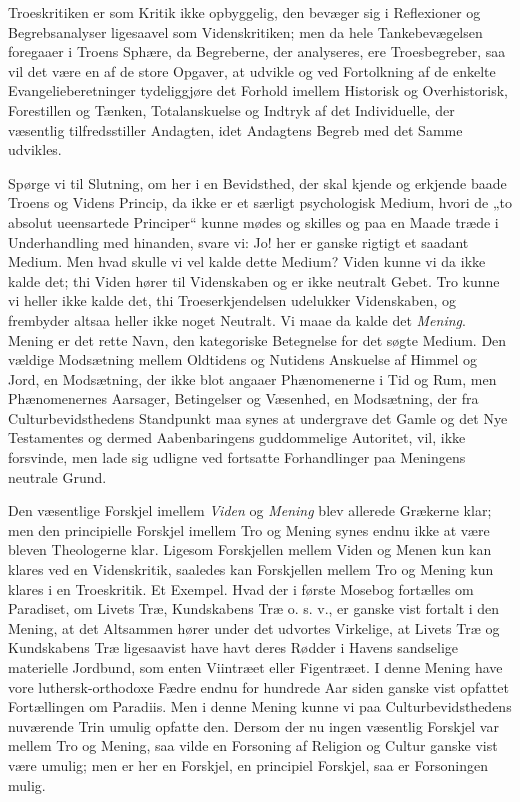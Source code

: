 \documentclass[12pt]{book}
\newcommand{\opage}[1]{\marginnote{\footnotesize\textit{[#1]}}}
\begin{document}
Troeskritiken er som Kritik ikke opbyggelig, den bevæger
sig i Reflexioner og Begrebsanalyser ligesaavel som Videnskritiken;
men da hele Tankebevægelsen foregaaer i Troens
Sphære, da Begreberne, der analyseres, ere Troesbegreber,
saa vil det være en af de store Opgaver, at udvikle og ved
Fortolkning af de enkelte Evangelieberetninger tydeliggjøre det
Forhold imellem Historisk og Overhistorisk, Forestillen og
Tænken, Totalanskuelse og Indtryk af det Individuelle, der
væsentlig tilfredsstiller Andagten, idet Andagtens Begreb med
det Samme udvikles.

Spørge vi til Slutning, om her i en Bevidsthed, der
skal kjende og erkjende baade Troens og Videns Princip, da
ikke er et særligt psychologisk Medium, hvori de „to absolut
ueensartede Principer“ kunne mødes og skilles og paa en
Maade træde i Underhandling med hinanden, svare vi:
Jo! her er ganske rigtigt et saadant Medium. Men hvad
skulle vi vel kalde dette Medium? Viden kunne vi da ikke
kalde det; thi Viden hører til Videnskaben og er ikke neutralt
Gebet. Tro kunne vi heller ikke kalde det, thi Troeserkjendelsen
udelukker Videnskaben, og frembyder altsaa heller
ikke noget Neutralt. Vi maae da kalde det \emph{Mening}.
Mening er det rette Navn, den kategoriske Betegnelse for det
søgte Medium. Den vældige Modsætning mellem Oldtidens
og Nutidens Anskuelse af Himmel og Jord, en Modsætning,
der ikke blot angaaer Phænomenerne i Tid og Rum, men
Phænomenernes Aarsager, Betingelser og Væsenhed, en Modsætning,
der fra Culturbevidsthedens Standpunkt maa synes
at undergrave det Gamle og det Nye Testamentes og dermed
Aabenbaringens guddommelige Autoritet, vil, ikke forsvinde,
men lade sig udligne ved fortsatte Forhandlinger paa
Meningens neutrale Grund.

\opage{63}\setcounter{footnote}{0}%
Den væsentlige Forskjel imellem \emph{Viden} og \emph{Mening}
blev allerede Grækerne klar; men den principielle Forskjel
imellem Tro og Mening synes endnu ikke at være bleven
Theologerne klar. Ligesom Forskjellen mellem Viden og
Menen %
kun kan klares ved en Videnskritik, saaledes kan
Forskjellen mellem Tro og Mening kun klares i en Troeskritik.
Et Exempel. Hvad der i første Mosebog fortælles
om Paradiset, om Livets Træ, Kundskabens Træ o. s. v.,
er ganske vist fortalt i den Mening, at det Altsammen hører
under det udvortes Virkelige, at Livets Træ og Kundskabens
Træ ligesaavist have havt deres Rødder i Havens sandselige
materielle Jordbund, som enten Viintræet eller Figentræet.
I denne Mening have vore luthersk-orthodoxe Fædre endnu
for hundrede Aar siden ganske vist opfattet Fortællingen om
Paradiis. Men i denne Mening kunne vi paa Culturbevidsthedens
nuværende Trin umulig opfatte den. Dersom
der nu ingen væsentlig Forskjel var mellem Tro og Mening,
saa vilde en Forsoning af Religion og Cultur ganske vist
være umulig; men er her en Forskjel, en principiel Forskjel,
saa er Forsoningen mulig.
\end{document}
